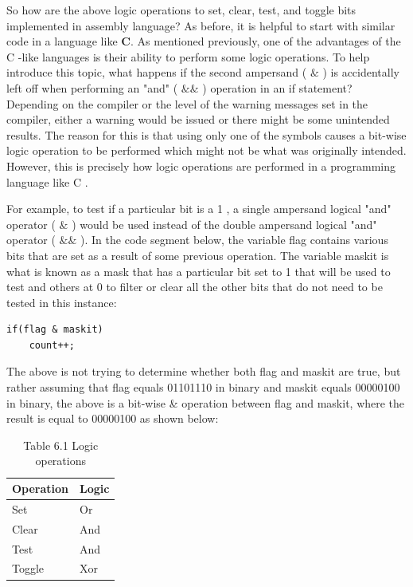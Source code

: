 \documentclass[10pt]{article}
\begin{document}
So how are the above logic operations to set, clear, test, and toggle bits implemented in assembly language? As before, it is helpful to start with similar code in a language like $\mathbf{C}$. As mentioned previously, one of the advantages of the C -like languages is their ability to perform some logic operations. To help introduce this topic, what happens if the second ampersand ( $\&$ ) is accidentally left off when performing an "and" ( $\& \&$ ) operation in an if statement? Depending on the compiler or the level of the warning messages set in the compiler, either a warning would be issued or there might be some unintended results. The reason for this is that using only one of the symbols causes a bit-wise logic operation to be performed which might not be what was originally intended. However, this is precisely how logic operations are performed in a programming language like C .

For example, to test if a particular bit is a 1 , a single ampersand logical "and" operator ( $\&$ ) would be used instead of the double ampersand logical "and" operator ( $\& \&$ ). In the code segment below, the variable flag contains various bits that are set as a result of some previous operation. The variable maskit is what is known as a mask that has a particular bit set to 1 that will be used to test and others at 0 to filter or clear all the other bits that do not need to be tested in this instance:

\begin{verbatim}
if(flag & maskit)
    count++;
\end{verbatim}

The above is not trying to determine whether both flag and maskit are true, but rather assuming that flag equals 01101110 in binary and maskit equals 00000100 in binary, the above is a bit-wise \& operation between flag and maskit, where the result is equal to 00000100 as shown below:

\begin{table}[h]
\begin{center}
\captionsetup{labelformat=empty}
\caption{Table 6.1 Logic operations}
\begin{tabular}{|ll|}
\hline
Operation & Logic \\
\hline
Set & Or \\
Clear & And \\
Test & And \\
Toggle & Xor \\
\hline
\end{tabular}
\end{center}
\end{table}
\end{document}
